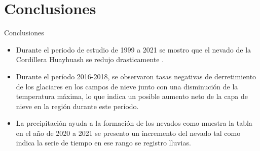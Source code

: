 \documentclass[handout,t]{beamer}
\begin{document}
\section{Conclusiones}
\begin{frame}{Conclusiones}
  \begin{itemize}
    \item \small{Durante el periodo de estudio de 1999 a 2021 se mostro que el nevado de la Cordillera Huayhuash se redujo drasticamente .}
    \item \small{Durante el período 2016-2018, se observaron tasas negativas de derretimiento de los glaciares en los campos de nieve junto con una disminución de la temperatura máxima, lo que indica un posible aumento neto de la capa de nieve en la región durante este período.}
    \item \small{La precipitación ayuda a la formación de los nevados como muestra la tabla en el año de 2020 a 2021 se presento un incremento del nevado tal como indica la serie de tiempo en ese rango se registro lluvias.}
    \end{itemize}
\end{frame}

\end{document}
